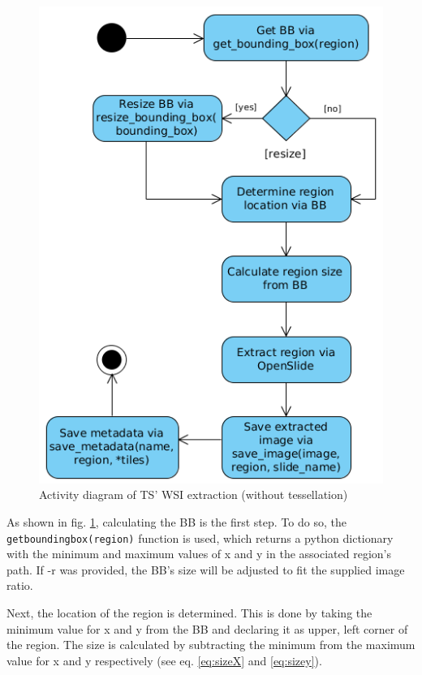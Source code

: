 \begin{figure}[H]
	\begin{center}
		\includegraphics[scale=0.45]{img/ts_wsi_uml.png}
		\caption{Activity diagram of TS' WSI extraction (without tessellation)}
		\label{fig5_tsWsiUml}
	\end{center}
\end{figure}

As shown in fig. \ref{fig5_tsWsiUml}, calculating the BB is the first step. To do so, the \texttt{get{\textunderscore}bounding{\textunderscore}box(region)} function is used, which returns a python dictionary with the minimum and maximum values of x and y in the associated region's path. If -r was provided, the BB's size will be adjusted to fit the supplied image ratio.

Next, the location of the region is determined. This is done by taking the minimum value for x and y from the BB and declaring it as upper, left corner of the region. The size is calculated by subtracting the minimum from the maximum value for x and y respectively (see eq. \ref{eq:sizeX} and \ref{eq:sizey}).

